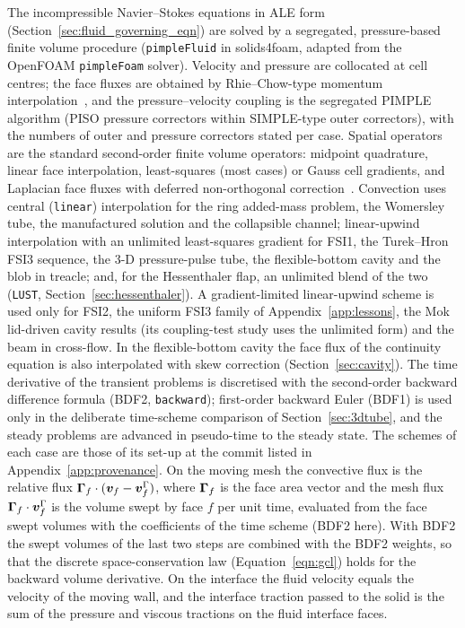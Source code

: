 The incompressible Navier--Stokes equations in ALE form (Section~\ref{sec:fluid_governing_eqn}) are solved by a segregated, pressure-based finite volume procedure (\texttt{pimpleFluid} in solids4foam, adapted from the OpenFOAM \texttt{pimpleFoam} solver).
Velocity and pressure are collocated at cell centres; the face fluxes are obtained by Rhie--Chow-type momentum interpolation~\citep{Rhie1983}, and the pressure--velocity coupling is the segregated PIMPLE algorithm (PISO pressure correctors within SIMPLE-type outer correctors), with the numbers of outer and pressure correctors stated per case.
Spatial operators are the standard second-order finite volume operators: midpoint quadrature, linear face interpolation, least-squares (most cases) or Gauss cell gradients, and Laplacian face fluxes with deferred non-orthogonal correction~\citep{Jasak1996}.
Convection uses central (\texttt{linear}) interpolation for the ring added-mass problem, the Womersley tube, the manufactured solution and the collapsible channel; linear-upwind interpolation with an unlimited least-squares gradient for FSI1, the Turek--Hron FSI3 sequence, the 3-D pressure-pulse tube, the flexible-bottom cavity and the blob in treacle; and, for the Hessenthaler flap, an unlimited blend of the two (\texttt{LUST}, Section~\ref{sec:hessenthaler}).
A gradient-limited linear-upwind scheme is used only for FSI2, the uniform FSI3 family of Appendix~\ref{app:lessons}, the Mok lid-driven cavity results (its coupling-test study uses the unlimited form) and the beam in cross-flow.
In the flexible-bottom cavity the face flux of the continuity equation is also interpolated with skew correction (Section~\ref{sec:cavity}).
The time derivative of the transient problems is discretised with the second-order backward difference formula (BDF2, \texttt{backward}); first-order backward Euler (BDF1) is used only in the deliberate time-scheme comparison of Section~\ref{sec:3dtube}, and the steady problems are advanced in pseudo-time to the steady state.
The schemes of each case are those of its set-up at the commit listed in Appendix~\ref{app:provenance}.
On the moving mesh the convective flux is the relative flux $\boldsymbol{\Gamma}_f\cdot(\boldsymbol{v}_f - \boldsymbol{v}^\Gamma_f)$, where $\boldsymbol{\Gamma}_f$ is the face area vector and the mesh flux $\boldsymbol{\Gamma}_f\cdot\boldsymbol{v}^\Gamma_f$ is the volume swept by face $f$ per unit time, evaluated from the face swept volumes with the coefficients of the time scheme (BDF2 here).
With BDF2 the swept volumes of the last two steps are combined with the BDF2 weights, so that the discrete space-conservation law (Equation~\eqref{eqn:gcl}) holds for the backward volume derivative.
On the interface the fluid velocity equals the velocity of the moving wall, and the interface traction passed to the solid is the sum of the pressure and viscous tractions on the fluid interface faces.


